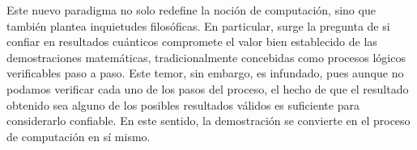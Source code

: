 \documentclass[digital, 11pt]{fc-hw-template}
\begin{document}
Este nuevo paradigma no solo redefine la noción de computación, sino que también plantea inquietudes filosóficas. En particular, surge la pregunta de si confiar en resultados cuánticos compromete el valor bien establecido de las demostraciones matemáticas, tradicionalmente concebidas como procesos lógicos verificables paso a paso. Este temor, sin embargo, es infundado, pues aunque no podamos verificar cada uno de los pasos del proceso, el hecho de que el resultado obtenido sea alguno de los posibles resultados válidos es suficiente para considerarlo confiable. En este sentido, la demostración se convierte en el proceso de computación en sí mismo.
\printbibliography
\end{document}
